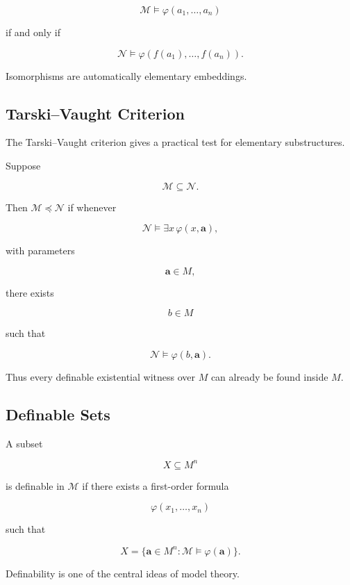 \[
\boxed{
\mathcal{M}
\models
\varphi(a_1,\ldots,a_n)
}
\]

if and only if

\[
\boxed{
\mathcal{N}
\models
\varphi
(
f(a_1),\ldots,f(a_n)
).
}
\]

Isomorphisms are automatically elementary embeddings.

\subsection{Tarski--Vaught Criterion}
\label{subsec:tarski-vaught-criterion}

The Tarski--Vaught criterion gives a practical test for elementary
substructures.

Suppose

\[
\mathcal{M}
\subseteq
\mathcal{N}.
\]

Then \(\mathcal{M}\preccurlyeq\mathcal{N}\) if whenever

\[
\mathcal{N}
\models
\exists x\,\varphi(x,\mathbf{a}),
\]

with parameters

\[
\mathbf{a}\in M,
\]

there exists

\[
b\in M
\]

such that

\[
\boxed{
\mathcal{N}
\models
\varphi(b,\mathbf{a}).
}
\]

Thus every definable existential witness over \(M\) can already be found
inside \(M\).

\subsection{Definable Sets}
\label{subsec:model-theoretic-definable-sets}

A subset

\[
X\subseteq M^n
\]

is definable in \(\mathcal{M}\) if there exists a first-order formula

\[
\varphi(x_1,\ldots,x_n)
\]

such that

\[
\boxed{
X
=
\{
\mathbf{a}\in M^n:
\mathcal{M}\models\varphi(\mathbf{a})
\}.
}
\]

Definability is one of the central ideas of model theory.

